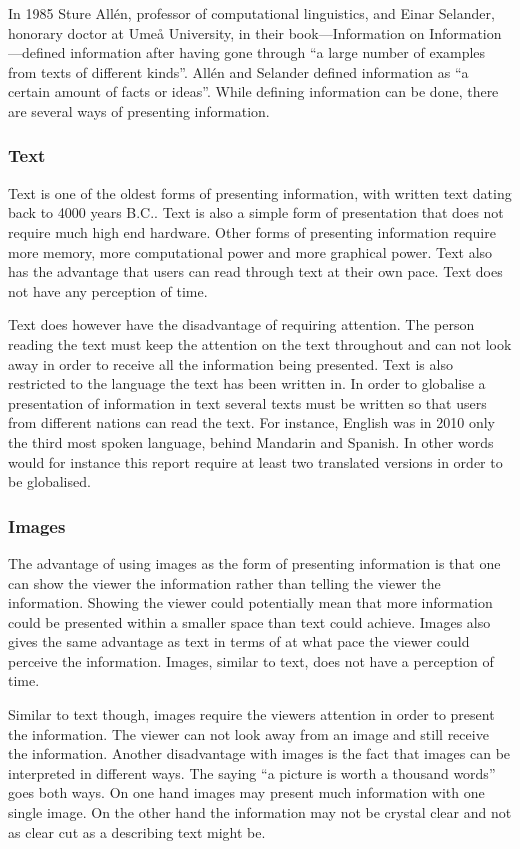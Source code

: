 In 1985 Sture All{\'e}n, professor of computational linguistics, and Einar Selander, honorary doctor at Ume{\aa} University, in their book---Information on Information---defined information after having gone through ``a large number of examples from texts of different kinds''.\cite{informationDef1} All{\'e}n and Selander defined information as ``a certain amount of facts or ideas''. While defining information can be done, there are several ways of presenting information.

\subsubsection{Text}
Text is one of the oldest forms of presenting information, with written text dating back to 4000 years B.C..\cite{cuneiform} Text is also a simple form of presentation that does not require much high end hardware. Other forms of presenting information require more memory, more computational power and more graphical power. Text also has the advantage that users can read through text at their own pace. Text does not have any perception of time.

Text does however have the disadvantage of requiring attention. The person reading the text must keep the attention on the text throughout and can not look away in order to receive all the information being presented. Text is also restricted to the language the text has been written in. In order to globalise a presentation of information in text several texts must be written so that users from different nations can read the text. For instance, English was in 2010 only the third most spoken language, behind Mandarin and Spanish.\cite{sprakNe} In other words would for instance this report require at least two translated versions in order to be globalised.

\subsubsection{Images}
The advantage of using images as the form of presenting information is that one can show the viewer the information rather than telling the viewer the information. Showing the viewer could potentially mean that more information could be presented within a smaller space than text could achieve. Images also gives the same advantage as text in terms of at what pace the viewer could perceive the information. Images, similar to text, does not have a perception of time.

Similar to text though, images require the viewers attention in order to present the information. The viewer can not look away from an image and still receive the information. Another disadvantage with images is the fact that images can be interpreted in different ways. The saying ``a picture is worth a thousand words'' goes both ways. On one hand images may present much information with one single image. On the other hand the information may not be crystal clear and not as clear cut as a describing text might be.

